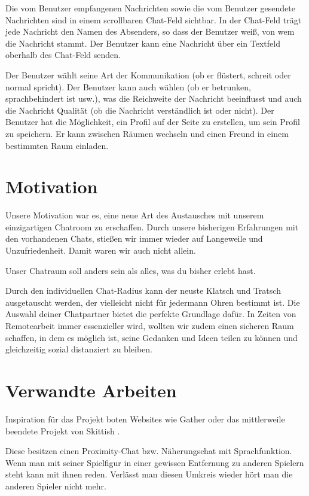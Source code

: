 \documentclass[conference]{IEEEtran}
\begin{document}
	Die vom Benutzer empfangenen Nachrichten sowie die vom Benutzer gesendete Nachrichten sind in einem scrollbaren Chat-Feld sichtbar. In der Chat-Feld trägt jede Nachricht den Namen des Absenders, so dass der Benutzer weiß, von wem die Nachricht stammt. Der Benutzer kann eine Nachricht über ein Textfeld oberhalb des Chat-Feld senden.
	
	Der Benutzer wählt seine Art der Kommunikation (ob er flüstert, schreit oder normal spricht). Der Benutzer kann auch wählen (ob er betrunken, sprachbehindert ist usw.), was die Reichweite der Nachricht beeinflusst und auch die Nachricht Qualität (ob die Nachricht verständlich ist oder nicht). Der Benutzer hat die Möglichkeit, ein Profil auf der Seite zu erstellen, um sein Profil zu speichern. Er kann zwischen Räumen wechseln und einen Freund in einem bestimmten Raum einladen.
	\ \\

	\section{Motivation}
	Unsere Motivation war es, eine neue Art des Austausches mit unserem einzigartigen Chatroom zu erschaffen. 
	Durch unsere bisherigen Erfahrungen mit den vorhandenen Chats, stießen wir immer wieder auf Langeweile und Unzufriedenheit. Damit waren wir auch nicht allein.
	
	Unser Chatraum soll anders sein als alles, was du bisher erlebt hast. 
	
	Durch den individuellen Chat-Radius kann der neuste Klatsch und Tratsch ausgetauscht werden, der vielleicht nicht für jedermann Ohren bestimmt ist. Die Auswahl deiner Chatpartner bietet die perfekte Grundlage dafür. 
	In Zeiten von Remotearbeit immer essenzieller wird, wollten wir zudem einen sicheren Raum schaffen, in dem es möglich ist, seine Gedanken und Ideen teilen zu können und gleichzeitig sozial distanziert zu bleiben.
	\ \\

	\section{Verwandte Arbeiten}
	Inspiration für das Projekt boten Websites wie Gather \cite{gathertown} oder das mittlerweile beendete Projekt von Skittish \cite{skittish}.
	
	Diese besitzen einen Proximity-Chat bzw. Näherungschat mit Sprachfunktion. Wenn man mit seiner Spielfigur in einer gewissen Entfernung zu anderen Spielern steht kann mit ihnen reden. Verlässt man diesen Umkreis wieder hört man die anderen Spieler nicht mehr.
	
\end{document}
